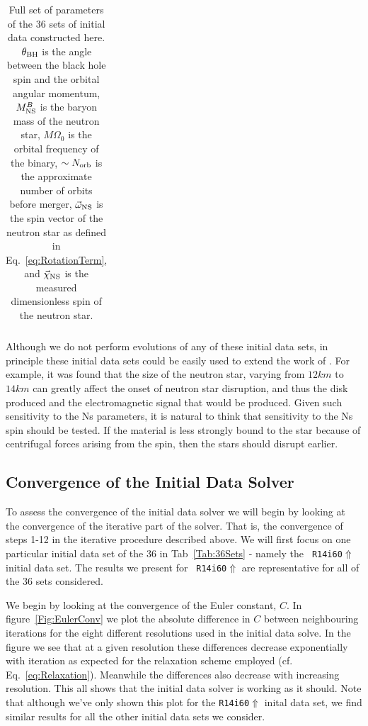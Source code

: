 \begin{longtable}{l|c|c|c|c|c|c}
\caption[Initial data set parameters for series of 36 Bh-Ns initial
data sets.]{\label{tab:FullBHNSParameters}Full set of parameters of
  the 36 sets of initial data constructed here. $\theta_{\rm BH}$ is
  the angle between the black hole spin and the orbital angular
  momentum, $M^B_{\rm NS}$ is the baryon mass of the neutron star,
  $M\Omega_0$ is the orbital frequency of the binary, $\sim N_{\rm
    orb}$ is the approximate number of orbits before merger,
  $\vec{\omega}_{\rm NS}$ is the spin vector of the neutron star as
  defined in Eq.~\ref{eq:RotationTerm}, and $\vec{\chi}_{\rm NS}$ is
  the measured dimensionless spin of the neutron star.}
\end{longtable}

Although we do not perform evolutions of any of these initial data sets, in principle these initial data sets could be easily used to
extend the work of \cite{Foucart:2013a}. For example, it was found
that the size of the neutron star, varying from $12km$ to $14km$ can
greatly affect the onset of neutron star disruption, and thus the disk
produced and the electromagnetic signal that would be produced. Given
such sensitivity to the Ns parameters, it is natural to think that
sensitivity to the Ns spin should be tested. If the material is less
strongly bound to the star because of centrifugal forces arising from
the spin, then the stars should disrupt earlier.

\subsection{Convergence of the Initial Data Solver}
To assess the convergence of the initial data solver we will begin by looking at the convergence of the iterative part of the solver. That is, the convergence of steps 1-12 in the iterative procedure
described above. We will first focus on one particular initial data
set of the 36 in Tab~\ref{Tab:36Sets} - namely the {\tt
  R14i60$\Uparrow$} initial data set. The results we present for {\tt
  R14i60$\Uparrow$} are representative for all of the 36 sets considered.

We begin by looking at the convergence of the Euler constant, $C$. In figure~\ref{Fig:EulerConv} we plot the absolute difference in $C$ between neighbouring iterations for the eight
different resolutions used in the initial data solve. %
In the figure we see that at a given resolution these differences
decrease exponentially with iteration as expected for the relaxation
scheme employed (cf. Eq.~\ref{eq:Relaxation}). Meanwhile the differences also decrease with increasing resolution. This all shows that the initial data solver is working as it should. Note that although we've only shown
this plot for the {\tt R14i60$\Uparrow$} inital data set, we find similar results for all the other initial data sets we consider.


